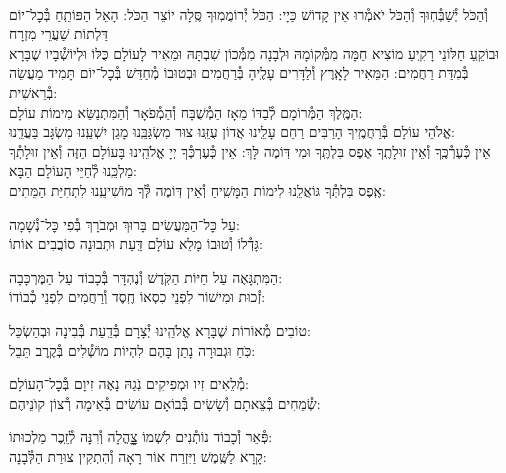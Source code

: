 \documentclass[twoside, openany, parskip=half, 11pt]{book}
\begin{document}
\\
\shatz {}
וְ֯הַכֹּל יְ֯שַׁבְּ֯חֽוּךָ וְ֯הַכֹּל יֹאמְ֯רוּ אֵין קָדוֹשׁ כַּיָי:\hfill \break
\kahal הַכֹּל יְ֯רוֹמֲמֽוּךָ סֶּֽלָה יוֹצֵר הַכֹּל: הָאֵל הַפּוֹתֵֽחַ בְּ֯כׇל־יוֹם דַּלְתוֹת שַׁעֲרֵי מִזְרָח\\
\shatz וּבוֹקֵֽעַ חַלּוֹנֵי רָקִֽיעַ מוֹצִיא חַמָּה מִמְּ֯קוֹמָהּ וּלְבָנָה מִמְּ֯כוֹן שִׁבְתָּהּ
\kahal וּמֵאִיר לָעוֹלָם כֻּלּוֹ וּלְיוֹשְׁ֯בָיו שֶׁבָּרָא בְּ֯מִדַּת רַחֲמִים: \hfill \break
\shatz הַמֵּאִיר לָאָֽרֶץ וְ֯לַדָּרִים עָלֶֽיהָ בְּ֯רַחֲמִים וּבְטוּבוֹ מְ֯חַדֵּשׁ בְּ֯כׇל־יוֹם תָּמִיד מַעֲשֵׂה בְ֯רֵאשִׁית: \\
\kahal הַמֶּֽלֶךְ הַמְּ֯רוֹמָם לְ֯בַדּוֹ מֵאָז הַמְ֯שֻׁבָּח וְ֯הַמְ֯פֹאָר וְ֯הַמִּתְנַשֵּׂא מִימוֹת עוֹלָם: \\
\shatz אֱלֹהֵי עוֹלָם בְּ֯רַחֲמֶֽיךָ הָרַבִּים רַחֵם עָלֵֽינוּ אֲדוֹן עֻזֵּֽנוּ צוּר מִשְׂגַּבֵּֽנוּ מָגֵן יִשְׁעֵֽנוּ מִשְׂגָּב בַּעֲדֵֽנוּ: \\
\kahal אֵין כְּ֯עֶרְ֯כֶּֽךָ וְ֯אֵין זוּלָתֶֽךָ אֶפֶס בִּלְתֶּֽךָ וּמִי דּֽוֹמֶה לָּךְ: \hfill \break
\shatz אֵין כְּ֯עֶרְכְּ֯ךָ יְיָ אֱלֹהֵֽינוּ בָּעוֹלָם הַזֶּה וְ֯אֵין זוּלָתְ֯ךָ מַלְכֵּֽנוּ לְ֯חַיֵּי הָעוֹלָם הַבָּא:\\
\kahal אֶֽפֶס בִּלְתְּ֯ךָ גּוֹאֲלֵֽנוּ לִימוֹת הַמָּשִֽׁיחַ וְ֯אֵין דּֽוֹמֶה לְּ֯ךָ מוֹשִׁיעֵֽנוּ לִתְחִיַּת הַמֵּתִים:

\shatz {}
עַל כׇּל־הַמַּעֲשִׂים \hfill בָּרוּךְ וּמְבֹרָךְ בְּ֯פִי כׇּל־נְ֯שָׁמָה: \\
\kahal גָּדְ֯לוֹ וְ֯טוּבוֹ מָלֵא עוֹלָם \hfill דַּֽעַת וּתְבוּנָה סוֹבֲבִים אוֹתוֹ:

\shatz הַמִּתְגָּאֶה עַל חַיּוֹת הַקֹּֽדֶשׁ \hfill וְ֯נֶהְדָּר בְּ֯כָבוֹד עַל הַמֶּרְכָּבָה:\\
\kahal זְ֯כוּת וּמִישׁוֹר לִפְנֵי כִסְאוֹ \hfill חֶֽסֶד וְ֯רַחֲמִים לִפְנֵי כְ֯בוֹדוֹ:

\shatz טוֹבִים מְ֯אוֹרוֹת שֶׁבָּרָא אֱלֹהֵֽינוּ \hfill יְ֯צָרָם בְּ֯דַֽעַת בְּ֯בִינָה וּבְהַשְׂכֵּל:\\
\kahal כֹּֽחַ וּגְבוּרָה נָתַן בָּהֶם \hfill לִהְיוֹת מוֹשְׁ֯לִים בְּ֯קֶֽרֶב תֵּבֵל:

\shatz מְ֯לֵאִים זִיו וּמְפִיקִים נֹֽגַהּ \hfill נָאֶה זִיוָם בְּ֯כׇל־הָעוֹלָם: \\
\kahal שְׂ֯מֵחִים בְּ֯צֵאתָם וְ֯שָׂשִׂים בְּ֯בוֹאָם \hfill עוֹשִׂים בְּ֯אֵימָה רְ֯צוֹן קוׂנֵיהֶם:

\shatz פְּ֯אֵר וְ֯כָבוֹד נוֹתְ֯נִים לִשְׁמוֹ \hfill צׇׇׇׇׇהֳלָה וְ֯רִנָּה לְ֯זֵֽכֶר מַלְכוּתוֹ: \\
\kahal קָרָא לַשֶּֽׁמֶשׁ וַיִּזְרַח אוֹר \hfill רָאָה וְ֯הִתְקִין צוּרַת הַלְּ֯בָנָה:
\end{document}
